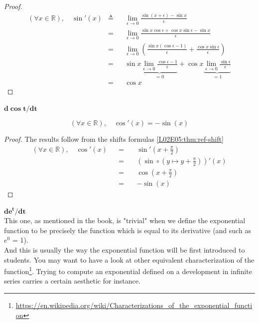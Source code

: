 \documentclass[solutions.tex]{subfiles}
\renewcommand{\bm}[1]{\pmb{#1}}
\begin{document}
\begin{proof}
\begin{equation*} \begin{aligned}
	(\forall x \in\mathbb{R}),\quad\sin'(x) &\triangleq&& \lim_{\epsilon \rightarrow 0}
		\frac{\sin(x+\epsilon)-\sin x}{\epsilon} \\
	~ &=&& \lim_{\epsilon \rightarrow 0}
		\frac{\sin x\cos\epsilon+\cos x\sin\epsilon-\sin x}{\epsilon} \\
	~ &=&& \lim_{\epsilon \rightarrow 0}\left(
		\frac{\sin x(\cos\epsilon-1)}{\epsilon}+\frac{\cos x\sin\epsilon}{\epsilon}
		\right) \\
	~ &=&& \sin x\underbrace{
			\lim_{\epsilon \rightarrow 0}\frac{\cos\epsilon-1}{\epsilon}
		}_{=0}
		+\cos x\underbrace{
			\lim_{\epsilon\rightarrow 0}\frac{\sin\epsilon}{\epsilon}
		}_{=1} \\
	~ &=&& \boxed{\cos x}
\end{aligned} \end{equation*}
\end{proof}
\hr
$\bm{d\cos t/dt}$\,\\
\begin{theorem}
\[
	(\forall x\in\mathbb{R}),\quad \boxed{\cos'(x) = -\sin(x)}
\]
\end{theorem}
\begin{proof}
The results follow from the shifts formulas \ref{L02E05:thm:ref-shift}
\begin{equation*} \begin{aligned}
	(\forall x\in\mathbb{R}),\quad \cos'(x) &&=\quad&
		\sin'(x+\frac\pi2) \\
	~ &&=\quad& (\sin\circ(y \mapsto y+\frac\pi2))'(x) \\
	~ &&=\quad& \cos(x+\frac\pi2) \\
	~ &&=\quad& \boxed{-\sin(x)}
\end{aligned} \end{equation*}
\end{proof}

\hr
$\bm{d e^t/dt}$\,\\
This one, as mentioned in the book, is "trivial" when we define the
exponential function to be precisely the function which is equal to
its derivative (and such as $e^0$ = 1). \\

And this is usually the way the exponential function will be first
introduced to students. You may want to have a look at other equivalent
characterization of the function\footnote
{\url{https://en.wikipedia.org/wiki/Characterizations\_of\_the\_exponential\_function}}.
Trying to compute an exponential defined on a development in infinite
series carries a certain aesthetic for instance.
\end{document}
